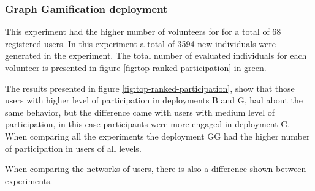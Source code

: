 \documentclass[conference]{IEEEtran}
\begin{document}
\subsubsection{ Graph Gamification deployment}
This experiment had the higher number of volunteers for for a total of 68 registered users. 
In this experiment a total of 3594 new individuals were generated in the experiment. 
The total number of evaluated individuals for each volunteer is presented in figure 
\ref{fig:top-ranked-participation} in green. 

The results presented in figure \ref{fig:top-ranked-participation}, show that those users with
higher level of participation in deployments B and G, had about the same behavior, but the difference
came with users with medium level of participation, in this case participants were more engaged in deployment
G. When comparing all the experiments the deployment GG had the higher number of participation in users
of all levels.    

When comparing the networks of users, there is also a difference shown between experiments. 
\end{document}
